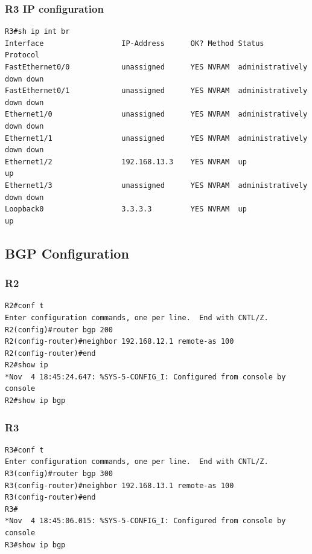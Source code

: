 \documentclass[paper=letter, fontsize=12pt]{article}
\begin{document}
\subsubsection{R3 IP configuration}
\begin{verbatim}
R3#sh ip int br
Interface                  IP-Address      OK? Method Status                Protocol
FastEthernet0/0            unassigned      YES NVRAM  administratively down down
FastEthernet0/1            unassigned      YES NVRAM  administratively down down
Ethernet1/0                unassigned      YES NVRAM  administratively down down
Ethernet1/1                unassigned      YES NVRAM  administratively down down
Ethernet1/2                192.168.13.3    YES NVRAM  up                    up
Ethernet1/3                unassigned      YES NVRAM  administratively down down
Loopback0                  3.3.3.3         YES NVRAM  up                    up
\end{verbatim}

\subsection{BGP Configuration}
\subsubsection{R2}
\begin{verbatim}
R2#conf t
Enter configuration commands, one per line.  End with CNTL/Z.
R2(config)#router bgp 200
R2(config-router)#neighbor 192.168.12.1 remote-as 100
R2(config-router)#end
R2#show ip
*Nov  4 18:45:24.647: %SYS-5-CONFIG_I: Configured from console by console
R2#show ip bgp
\end{verbatim}

\subsubsection{R3}
\begin{verbatim}
R3#conf t
Enter configuration commands, one per line.  End with CNTL/Z.
R3(config)#router bgp 300
R3(config-router)#neighbor 192.168.13.1 remote-as 100
R3(config-router)#end
R3#
*Nov  4 18:45:06.015: %SYS-5-CONFIG_I: Configured from console by console
R3#show ip bgp
\end{verbatim}
\end{document}
